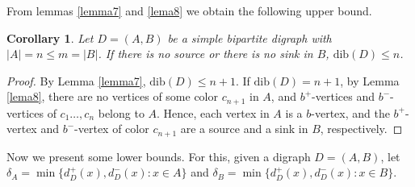 \documentclass[12pt]{article}
\newtheorem{corollary}[theorem]{Corollary}
\begin{document}
From lemmas \ref{lemma7} and \ref{lema8} we obtain the following upper bound.

\begin{corollary}
Let $D =(A, B)$ be a simple bipartite digraph with $|A| = n\leq m = |B|$. If there is no source or there is no sink in $B$,  $\text{dib}(D)\leq n$.
\end{corollary}
\begin{proof} By Lemma \ref{lemma7},  $\text{dib}(D)\leq n+1$. If $\text{dib}(D)= n+1$,
by Lemma \ref{lema8}, there are no vertices of some color $c_{n+1}$ in $A$, and $b^+$-vertices and $b^-$-vertices of $c_1\dots, c_{n}$ belong to $A$. Hence, each vertex in $A$ is a $b$-vertex, and the  $b^+$-vertex and $b^-$-vertex of color $c_{n+1}$ are a source and a sink in $B$, respectively.
\end{proof}

Now we present some lower bounds. For this, given a digraph $D =(A, B)$, let $\delta_A = \min\{d^+_D(x), d^-_D(x) : x\in A\}$ and  $\delta_B = \min\{d^+_D(x), d^-_D(x) : x\in B\}$.
\end{document}
